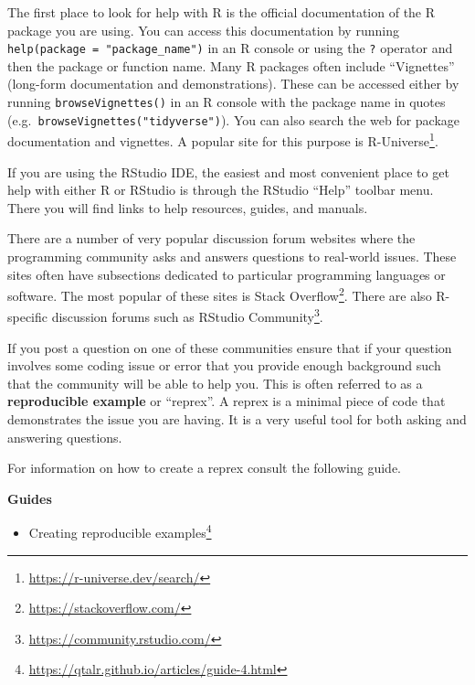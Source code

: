 \documentclass[
  letterpaper,
]{latex/krantz}
\providecommand{\tightlist}{%
  \setlength{\itemsep}{0pt}\setlength{\parskip}{0pt}}\usepackage{longtable,booktabs,array}
\DeclareRobustCommand{\href}[2]{#2\footnote{\url{#1}}}
\begin{document}
The first place to look for help with R is the official documentation of
the R package you are using. You can access this documentation by
running \texttt{help(package\ =\ "package\_name")} in an R console or
using the \texttt{?} operator and then the package or function name.
Many R packages often include ``Vignettes'' (long-form documentation and
demonstrations). These can be accessed either by running
\texttt{browseVignettes()} in an R console with the package name in
quotes (e.g.~\texttt{browseVignettes("tidyverse")}). You can also search
the web for package documentation and vignettes. A popular site for this
purpose is \href{https://r-universe.dev/search/}{R-Universe}.

If you are using the RStudio IDE, the easiest and most convenient place
to get help with either R or RStudio is through the RStudio ``Help''
toolbar menu. There you will find links to help resources, guides, and
manuals.

There are a number of very popular discussion forum websites where the
programming community asks and answers questions to real-world issues.
These sites often have subsections dedicated to particular programming
languages or software. The most popular of these sites is
\href{https://stackoverflow.com/}{Stack Overflow}. There are also
R-specific discussion forums such as
\href{https://community.rstudio.com/}{RStudio Community}.

If you post a question on one of these communities ensure that if your
question involves some coding issue or error that you provide enough
background such that the community will be able to help you. This is
often referred to as a \textbf{reproducible example} or ``reprex''. A
reprex is a minimal piece of code that demonstrates the issue you are
having. It is a very useful tool for both asking and answering
questions.

For information on how to create a reprex consult the following guide.

\begin{tcolorbox}[enhanced jigsaw, arc=.35mm, leftrule=.75mm, rightrule=.15mm, opacityback=0, colback=white, breakable, bottomrule=.15mm, left=2mm, toprule=.15mm]

\textbf{ Guides}

\begin{itemize}
\tightlist
\item
  \href{https://qtalr.github.io/articles/guide-4.html}{Creating
  reproducible examples}
\end{itemize}

\end{tcolorbox}
\end{document}
